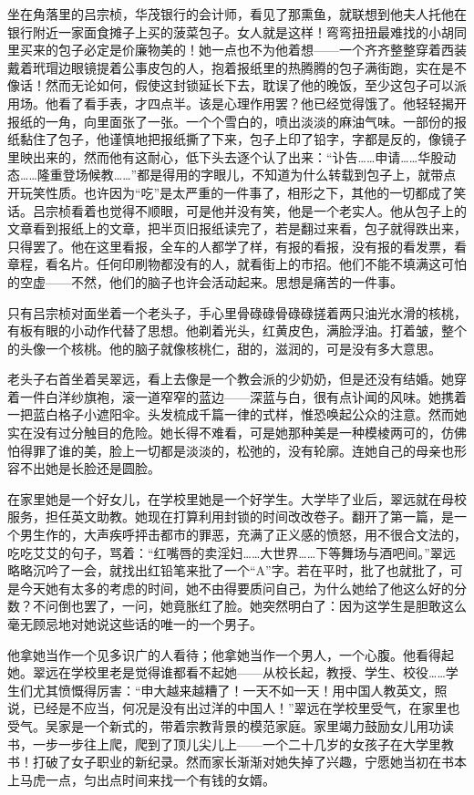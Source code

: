 \par 坐在角落里的吕宗桢，华茂银行的会计师，看见了那熏鱼，就联想到他夫人托他在银行附近一家面食摊子上买的菠菜包子。女人就是这样！弯弯扭扭最难找的小胡同里买来的包子必定是价廉物美的！她一点也不为他着想——一个齐齐整整穿着西装戴着玳瑁边眼镜提着公事皮包的人，抱着报纸里的热腾腾的包子满街跑，实在是不像话！然而无论如何，假使这封锁延长下去，耽误了他的晚饭，至少这包子可以派用场。他看了看手表，才四点半。该是心理作用罢？他已经觉得饿了。他轻轻揭开报纸的一角，向里面张了一张。一个个雪白的，喷出淡淡的麻油气味。一部份的报纸黏住了包子，他谨慎地把报纸撕了下来，包子上印了铅字，字都是反的，像镜子里映出来的，然而他有这耐心，低下头去逐个认了出来：“讣告……申请……华股动态……隆重登场候教……”都是得用的字眼儿，不知道为什么转载到包子上，就带点开玩笑性质。也许因为“吃”是太严重的一件事了，相形之下，其他的一切都成了笑话。吕宗桢看着也觉得不顺眼，可是他并没有笑，他是一个老实人。他从包子上的文章看到报纸上的文章，把半页旧报纸读完了，若是翻过来看，包子就得跌出来，只得罢了。他在这里看报，全车的人都学了样，有报的看报，没有报的看发票，看章程，看名片。任何印刷物都没有的人，就看街上的市招。他们不能不填满这可怕的空虚——不然，他们的脑子也许会活动起来。思想是痛苦的一件事。
\par 只有吕宗桢对面坐着一个老头子，手心里骨碌碌骨碌碌搓着两只油光水滑的核桃，有板有眼的小动作代替了思想。他剃着光头，红黄皮色，满脸浮油。打着皱，整个的头像一个核桃。他的脑子就像核桃仁，甜的，滋润的，可是没有多大意思。
\par 老头子右首坐着吴翠远，看上去像是一个教会派的少奶奶，但是还没有结婚。她穿着一件白洋纱旗袍，滚一道窄窄的蓝边——深蓝与白，很有点讣闻的风味。她携着一把蓝白格子小遮阳伞。头发梳成千篇一律的式样，惟恐唤起公众的注意。然而她实在没有过分触目的危险。她长得不难看，可是她那种美是一种模棱两可的，仿佛怕得罪了谁的美，脸上一切都是淡淡的，松弛的，没有轮廓。连她自己的母亲也形容不出她是长脸还是圆脸。
\par 在家里她是一个好女儿，在学校里她是一个好学生。大学毕了业后，翠远就在母校服务，担任英文助教。她现在打算利用封锁的时间改改卷子。翻开了第一篇，是一个男生作的，大声疾呼抨击都市的罪恶，充满了正义感的愤怒，用不很合文法的，吃吃艾艾的句子，骂着：“红嘴唇的卖淫妇……大世界……下等舞场与酒吧间。”翠远略略沉吟了一会，就找出红铅笔来批了一个“A”字。若在平时，批了也就批了，可是今天她有太多的考虑的时间，她不由得要质问自己，为什么她给了他这么好的分数？不问倒也罢了，一问，她竟胀红了脸。她突然明白了：因为这学生是胆敢这么毫无顾忌地对她说这些话的唯一的一个男子。
\par 他拿她当作一个见多识广的人看待；他拿她当作一个男人，一个心腹。他看得起她。翠远在学校里老是觉得谁都看不起她——从校长起，教授、学生、校役……学生们尤其愤慨得厉害：“申大越来越糟了！一天不如一天！用中国人教英文，照说，已经是不应当，何况是没有出过洋的中国人！”翠远在学校里受气，在家里也受气。吴家是一个新式的，带着宗教背景的模范家庭。家里竭力鼓励女儿用功读书，一步一步往上爬，爬到了顶儿尖儿上——一个二十几岁的女孩子在大学里教书！打破了女子职业的新纪录。然而家长渐渐对她失掉了兴趣，宁愿她当初在书本上马虎一点，匀出点时间来找一个有钱的女婿。

